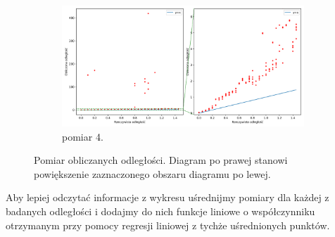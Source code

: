 \begin{figure}[H]
    \ContinuedFloat\centering
    \begin{subfigure}{\textwidth}
        \centering
        \includegraphics[width=\textwidth]{pics/mic_sync_dist/dists_long_3.png}
        \caption{pomiar 4.}
        \label{pic:slope_test_3}
    \end{subfigure}
    \caption{Pomiar obliczanych odległości.   Diagram po prawej stanowi powiększenie zaznaczonego obszaru diagramu po lewej.}
    \label{fig:slope_test}
\end{figure}

Aby lepiej odczytać informacje z wykresu uśrednijmy pomiary dla każdej z badanych odległości i dodajmy do nich funkcje liniowe o współczynniku otrzymanym przy pomocy regresji liniowej z tychże uśrednionych punktów.

